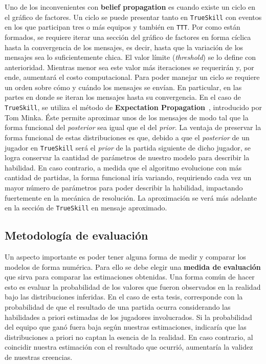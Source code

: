 \documentclass[11pt,twoside,spanish]{report} %
\begin{document}
Uno de los inconvenientes con \textbf{belief propagation} es cuando existe un ciclo en el gr\'afico de factores.
Un ciclo se puede presentar tanto en \texttt{TrueSkill} con eventos en los que participan tres o m\'as equipos y tambi\'en en \texttt{TTT}.
Por como est\'an formados, se requiere iterar una secci\'on del gr\'afico de factores en forma c\'iclica hasta la convergencia de los mensajes, es decir, hasta que la variaci\'on de los mensajes sea lo suficientemente chica.
El valor l\'imite (\textit{threshold}) se lo define con anterioridad.
Mientras menor sea este valor m\'as iteraciones se requerir\'an y, por ende, aumentar\'a el costo computacional.
Para poder manejar un ciclo se requiere un orden sobre c\'omo y cu\'ando los mensajes se env\'ian.
En particular, en las partes en donde se iteran los mensajes hasta su convergencia.
En el caso de \texttt{TrueSkill}, se utiliza el m\'etodo de \textbf{Expectation Propagation}~\cite{Herbrich2005}, introducido por Tom Minka.
\'Este permite aproximar unos de los mensajes de modo tal que la forma funcional del \textit{posterior} sea igual que el del \emph{prior}.
La ventaja de preservar la forma funcional de estas distribuciones es que, debido a que el \textit{posterior} de un jugador en \texttt{TrueSkill} ser\'a el \textit{prior} de la partida siguiente de dicho jugador, se logra conservar la cantidad de par\'ametros de nuestro modelo para describir la habilidad.
En caso contrario, a medida que el algoritmo evolucione con m\'as cantidad de partidas, la forma funcional ir\'ia variando, requiriendo cada vez un mayor n\'umero de par\'ametros para poder describir la habilidad, impactando fuertemente en la mec\'anica de resoluci\'on.
La aproximaci\'on se ver\'a m\'as adelante en la secci\'on de \texttt{TrueSkill} en mensaje aproximado.

\subsection{Metodolog\'ia de evaluaci\'on}

Un aspecto importante es poder tener alguna forma de medir y comparar los modelos de forma num\'erica.
Para ello se debe elegir una \textbf{medida de evaluaci\'on} que sirva para comparar las estimaciones obtenidas.
Una forma com\'un de hacer esto es evaluar la probabilidad de los valores que fueron observados en la realidad bajo las distribuciones inferidas.
En el caso de esta tesis, corresponde con la probabilidad de que el resultado de una partida ocurra considerando las habilidades a priori estimadas de los jugadores involucrados.
Si la probabilidad del equipo que gan\'o fuera baja seg\'un nuestras estimaciones, indicar\'ia que las distribuciones a priori no captan la esencia de la realidad.
En caso contrario, al coincidir nuestra estimaci\'on con el resultado que ocurri\'o, aumentar\'ia la validez de nuestras creencias.
\end{document}
